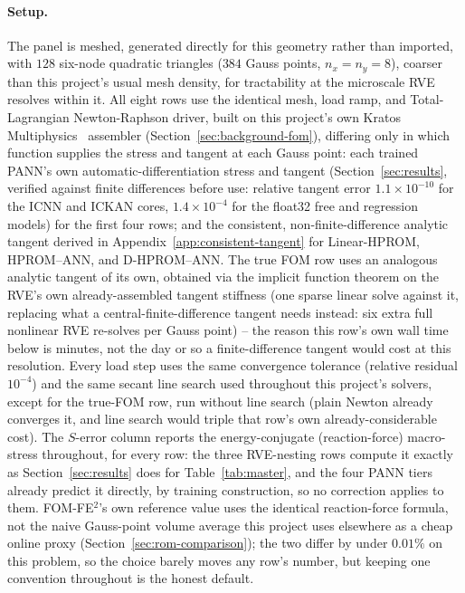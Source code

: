 \documentclass[10pt,a4paper]{article}
\begin{document}
\paragraph{Setup.} The panel is meshed, generated directly for this
geometry rather than imported, with $128$ six-node quadratic triangles
($384$ Gauss points, $n_x=n_y=8$), coarser than this project's usual
mesh density, for tractability at the microscale RVE resolves within
it. All eight rows use the identical mesh, load ramp, and
Total-Lagrangian Newton-Raphson driver, built on this project's own
Kratos Multiphysics~\cite{Dadvand2010} assembler
(Section~\ref{sec:background-fom}), differing only in which function
supplies the stress and tangent at each Gauss point: each trained PANN's
own automatic-differentiation stress and tangent (Section~\ref{sec:results},
verified against finite differences before use: relative tangent error
$1.1\times10^{-10}$ for the ICNN and ICKAN cores, $1.4\times10^{-4}$ for
the float32 free and regression models) for the first four rows; and the
consistent, non-finite-difference analytic tangent derived in
Appendix~\ref{app:consistent-tangent} for Linear-HPROM, HPROM--ANN, and
D-HPROM--ANN. The true FOM row uses an analogous analytic tangent of its
own, obtained via the implicit function theorem on the RVE's own
already-assembled tangent stiffness (one sparse linear solve against it,
replacing what a central-finite-difference tangent needs instead: six
extra full nonlinear RVE re-solves per Gauss point) -- the reason this
row's own wall time below is minutes, not the day or so a
finite-difference tangent would cost at this resolution. Every load step
uses the same convergence tolerance (relative residual $10^{-4}$) and
the same secant line search used throughout this project's solvers,
except for the true-FOM row, run without line search (plain Newton
already converges it, and line search would triple that row's own
already-considerable cost). The $S$-error column reports the
energy-conjugate (reaction-force) macro-stress throughout, for every
row: the three RVE-nesting rows compute it exactly as
Section~\ref{sec:results} does for Table~\ref{tab:master}, and the four
PANN tiers already predict it directly, by training construction, so no
correction applies to them. FOM-FE$^2$'s own reference value uses the
identical reaction-force formula, not the naive Gauss-point volume
average this project uses elsewhere as a cheap online proxy
(Section~\ref{sec:rom-comparison}); the two differ by under $0.01\%$ on
this problem, so the choice barely moves any row's number, but keeping
one convention throughout is the honest default.
\end{document}
